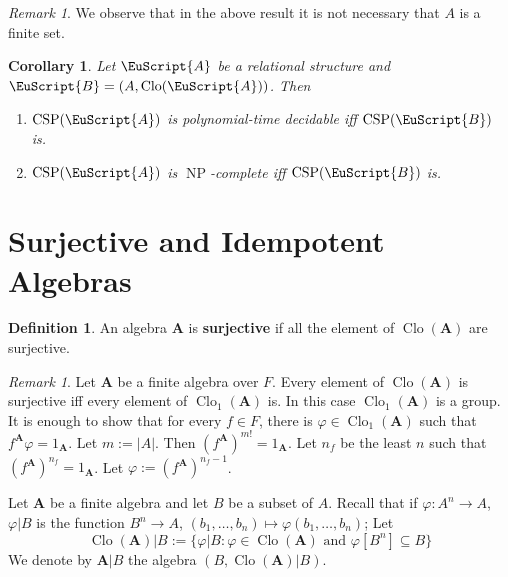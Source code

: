 \documentclass{amsart}
\theoremstyle{plain}
\newtheorem{corollary}[theorem]{Corollary}
\theoremstyle{definition}
\newtheorem{definition}[theorem]{Definition}
\theoremstyle{remark}
\newtheorem{remark}[theorem]{Remark}
\def\phi{\varphi}
\DeclareMathOperator{\Clo}{Clo}
\DeclareMathOperator{\CSP}{CSP}
\DeclareMathOperator{\NP}{NP}
\begin{document}
\begin{remark}
    We observe that in the above result it is not necessary that $A$ is a finite set. 
\end{remark}

\begin{corollary}
    Let $\EuScript{A}$ be a relational structure and $\EuScript{B}=(A, \Clo(\EuScript{A}))$. 
    Then 
    \begin{enumerate}
        \item $\CSP(\EuScript{A})$ is polynomial-time decidable iff $\CSP(\EuScript{B})$ is. 
        \item $\CSP(\EuScript{A})$ is $\NP$-complete iff $\CSP(\EuScript{B})$ is. 
    \end{enumerate}
    \begin{comment}
    \begin{proof}
        We prove that $\CSP(\EuScript{A})$ is polynomial-time equivalent to $\CSP(\EuScript{B})$. 
        Let $\EuScript{A}=(A,P)$. 
        Let $\Sigma$ be a finite set of atomic formulas over $P$. 

    \end{proof}
\end{comment}
\end{corollary}

\section{Surjective and Idempotent Algebras}

\begin{definition}
    An algebra $\mathbf{A}$ is \textbf{surjective} if all the element of $\Clo(\mathbf{A})$ are surjective. 
\end{definition}

\begin{remark}
    \label{surj_group}
    Let $\mathbf{A}$ be a finite algebra over $F$. 
    Every element of $\Clo(\mathbf{A})$ is surjective iff every element of $\Clo_1(\mathbf{A})$ is. 
    In this case $\Clo_1(\mathbf{A})$ is a group.
    It is enough to show that for every $f \in F$, there is $\phi \in \Clo_1(\mathbf{A})$ such that $f^\mathbf{A} \phi = 1_\mathbf{A}$. 
    Let $m:=|A|$. 
    Then $(f^{\mathbf{A}})^{m!}=1_\mathbf{A}$.
    Let $n_f$ be the least $n$ such that $(f^{\mathbf{A}})^{n_f}=1_\mathbf{A}$. 
    Let $\phi:=(f^{\mathbf{A}})^{n_f-1}$. 
\end{remark}

Let $\mathbf{A}$ be a finite algebra and let $B$ be a subset of $A$. 
Recall that if $\phi: A^n \to A$, $\phi| B$ is the function $B^n \to A$, $(b_1, \ldots, b_n) \mapsto \phi(b_1, \ldots, b_n)$; 
Let 
\begin{equation*}
    \Clo(\mathbf{A})|B:=\{\phi|B : \phi \in \Clo(\mathbf{A}) \text{ and } \phi[B^n] \subseteq B \}
\end{equation*} 
We denote by $\mathbf{A}|B$ the algebra $(B, \Clo(\mathbf{A})|B)$. 
\end{document}
